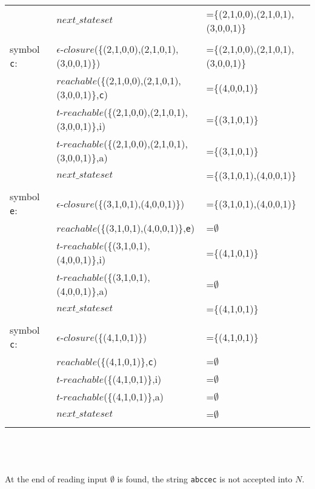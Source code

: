 \begin{myex}
\begin{table}[h!]
\begin{tabular}{l l l}
&$next\_stateset$&=\{(2,1,0,0),(2,1,0,1),(3,0,0,1)\}\\
\\
symbol {\tt c}:& $\epsilon$-$closure$(\{(2,1,0,0),(2,1,0,1),(3,0,0,1)\})&=\{(2,1,0,0),(2,1,0,1),(3,0,0,1)\}\\
&$reachable$(\{(2,1,0,0),(2,1,0,1),(3,0,0,1)\},{\tt c})&=\{(4,0,0,1)\}\\
&$t$-$reachable$(\{(2,1,0,0),(2,1,0,1),(3,0,0,1)\},i)&=\{(3,1,0,1)\}\\
&$t$-$reachable$(\{(2,1,0,0),(2,1,0,1),(3,0,0,1)\},a)&=\{(3,1,0,1)\}\\
&$next\_stateset$&=\{(3,1,0,1),(4,0,0,1)\}\\
\\
symbol {\tt e}:& $\epsilon$-$closure$(\{(3,1,0,1),(4,0,0,1)\})&=\{(3,1,0,1),(4,0,0,1)\}\\
&$reachable$(\{(3,1,0,1),(4,0,0,1)\},{\tt e})&=$\emptyset$\\
&$t$-$reachable$(\{(3,1,0,1),(4,0,0,1)\},i)&=\{(4,1,0,1)\}\\
&$t$-$reachable$(\{(3,1,0,1),(4,0,0,1)\},a)&=$\emptyset$\\
&$next\_stateset$&=\{(4,1,0,1)\}\\
\\
symbol {\tt c}:& $\epsilon$-$closure$(\{(4,1,0,1)\})&=\{(4,1,0,1)\}\\
&$reachable$(\{(4,1,0,1)\},{\tt c})&=$\emptyset$\\
&$t$-$reachable$(\{(4,1,0,1)\},i)&=$\emptyset$\\
&$t$-$reachable$(\{(4,1,0,1)\},a)&=$\emptyset$\\
&$next\_stateset$&=$\emptyset$\\
\\
\end{tabular}
\end{table}\\\\\\
At the end of reading input $\emptyset$ is found, the string {\tt abccec} is not accepted into $N$.
\end{myex}